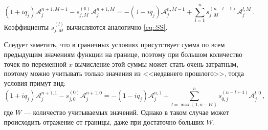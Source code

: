 \documentclass{fefu}
\newcommand{\pa}[1]{\left(#1\right)}
\begin{document}
                \begin{equation}
                    \pa{1+iq_j}\mathcal{A}_j^{n+1,M-1}-s_{j,M}^{\pa{0}}\mathcal{A}_j^{n+1,M}=-\pa{1-iq_j}\mathcal{A}_j^{n,M-1}+\sum\limits_{l=1}^ns_{j,M}^{\pa{n-l-1}}\mathcal{A}_j^{l,M}\,.
                \end{equation}
                Коэффициенты $s_{j,M}^{\pa{l}}$ вычисляются аналогично \eqref{eq::SS}.
                \par Следует заметить, что в граничных условиях присутствует сумма по всем предыдущим значениям функции на границе, поэтому при большом количество точек по переменной $x$ вычисление этой суммы может стать очень затратным, поэтому можно учитывать только значения из <<недавнего прошлого>>, тогда условия примут вид:
                \begin{equation}\label{eq::TBCW}
                    \pa{1+iq_j}\mathcal{A}_j^{n+1,1}-s_{j,0}^{\pa{0}}\mathcal{A}_j^{n+1,0}=-\pa{1-iq_j}\mathcal{A}_j^{n,1}+\sum\limits_{l=\max\left\{1,n-W\right\}}^ns_{0,j}^{\pa{n-l+1}}\mathcal{A}_j^{l,0}\,,
                \end{equation}
                где $W$ --- количество учитываемых значений. Однако в таком случае может происходить отражение от границы, даже при достаточно больших $W$.
\end{document}
